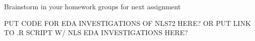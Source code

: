 \documentclass[8pt,ignorenonframetext,dvipsnames]{beamer}
\begin{document}
\begin{frame}{Brainstorm in your homework groups for next assignment}

PUT CODE FOR EDA INVESTIGATIONS OF NLS72 HERE? OR PUT LINK TO .R SCRIPT
W/ NLS EDA INVESTIGATIONS HERE?

\end{frame}
\end{document}

